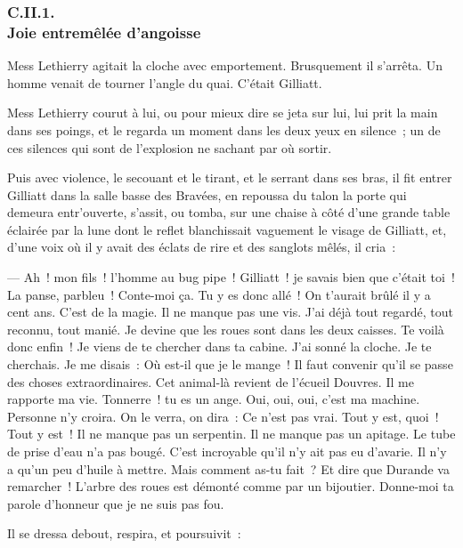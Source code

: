 \documentclass[french,twoside]{book} %
\begin{document}
  \subsubsection[{C.II.1. Joie entremêlée d’angoisse}]{C.II.1. \\
Joie entremêlée d’angoisse}
\noindent Mess Lethierry agitait la cloche avec emportement. Brusquement il s’arrêta. Un homme venait de tourner l’angle du quai. C’était Gilliatt.\par
Mess Lethierry courut à lui, ou pour mieux dire se jeta sur lui, lui prit la main dans ses poings, et le regarda un moment dans les deux yeux en silence ; un de ces silences qui sont de l’explosion ne sachant par où sortir.\par
Puis avec violence, le secouant et le tirant, et le serrant dans ses bras, il fit entrer Gilliatt dans la salle basse des Bravées, en repoussa du talon la porte qui demeura entr’ouverte, s’assit, ou tomba, sur une chaise à côté d’une grande table éclairée par la lune dont le reflet blanchissait vaguement le visage de Gilliatt, et, d’une voix où il y avait des éclats de rire et des sanglots mêlés, il cria :\par
 — Ah ! mon fils ! l’homme au bug pipe ! Gilliatt ! je savais bien que c’était toi ! La panse, parbleu ! Conte-moi ça. Tu y es donc allé ! On t’aurait brûlé il y a cent ans. C’est de la magie. Il ne manque pas une vis. J’ai déjà tout regardé, tout reconnu, tout manié. Je devine que les roues sont dans les deux caisses. Te voilà donc enfin ! Je viens de te chercher dans ta cabine. J’ai sonné la cloche. Je te cherchais. Je me disais : Où est-il que je le mange ! Il faut convenir qu’il se passe des choses extraordinaires. Cet animal-là revient de l’écueil Douvres. Il me rapporte ma vie. Tonnerre ! tu es un ange. Oui, oui, oui, c’est ma machine. Personne n’y croira. On le verra, on dira : Ce n’est pas vrai. Tout y est, quoi ! Tout y est ! Il ne manque pas un serpentin. Il ne manque pas un apitage. Le tube de prise d’eau n’a pas bougé. C’est incroyable qu’il n’y ait pas eu d’avarie. Il n’y a qu’un peu d’huile à mettre. Mais comment as-tu fait ? Et dire que Durande va remarcher ! L’arbre des roues est démonté comme par un bijoutier. Donne-moi ta parole d’honneur que je ne suis pas fou.\par
Il se dressa debout, respira, et poursuivit :\par
\end{document}
